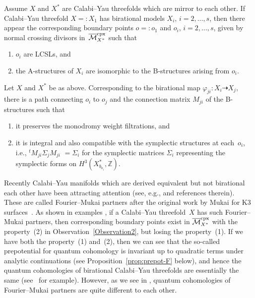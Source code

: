 \documentclass[10pt,a4paper]{amsart}
\numberwithin{equation}{section}
\begin{document}
\begin{Observation}\label{Observation1} %
Assume $X$ and $X^{*}$ are Calabi--Yau threefolds which are mirror to each other. If Calabi--Yau threefold $X=:X_{1}$ has birational models $X_{i}$, $i=2,\dots ,s$, then there appear the corresponding boundary points $o=:o_{1}$ and $o_{i}$, $i=2,\dots ,s$, given by normal crossing divisors in~$\overline{\mathcal{M}}_{X^{*}}^{\rm cpx}$ such that
\begin{enumerate}\itemsep=0pt
\item[(1)] $o_{i}$ are LCSLs, and
\item[(2)] the A-structures of $X_{i}$ are isomorphic to the B-structures
arising from $o_{i}$.
\end{enumerate}
\end{Observation}

\begin{Observation}\label{Observation2}
Let $X$ and $X^{*}$ be as above. Corresponding to the birational map $\varphi_{ji}\colon X_{i}\dashrightarrow X_{j}$, there is a path connecting $o_{i}$ to $o_{j}$ and the connection matrix $M_{ji}$ of the B-structures such that

\begin{enumerate}\itemsep=0pt
\item[(1)] it preserves the monodromy weight filtrations, and
\item[(2)] it is integral and also compatible with the symplectic structures at each~$o_{i}$, i.e., $^{t}M_{ji}\Sigma_{j}M_{ji}$ $=\Sigma_{i}$ for the symplectic matrices $\Sigma_{i}$ representing the symplectic forms on $H^{3}(X_{b_{o_{i}}}^{*},\mathbb{Z})$.
\end{enumerate}
\end{Observation}

\begin{Remark}Recently Calabi--Yau manifolds which are derived equivalent but not birational each other have been attracting attention (see, e.g., \cite{BoCa,HTjag,HoTaCIV,Kuz2} and references therein). These are called Fourier--Mukai partners after the original work by Mukai for K3 surfaces~\cite{Mukai}. As shown in examples \cite{BoCa,HTjag,vSt}, if a Calabi--Yau threefold~$X$ has such Fourier--Mukai partners, then corresponding boundary points exist in $\overline{\mathcal{M}}_{X^{*}}^{\rm cpx}$ with the property~(2) in Observation~\ref{Observation2}, but losing the property~(1). If we have both the property~(1) and~(2), then we can see that the so-called prepotential for quantum cohomology is invariant up to quadratic terms under analytic continuations (see Proposition~\ref{prop:prepot-F} below), and hence the quantum cohomologies of birational Calabi--Yau threefolds are essentially the same (see~\cite{LLWang} for example). However, as we see in \cite{BCKvS,HoKo,HTjag,Ro}, quantum cohomologies of Fourier--Mukai partners are quite different to each other.
\end{Remark}
\end{document}
